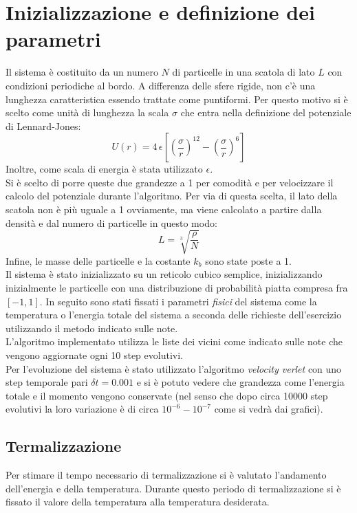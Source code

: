 \section{Inizializzazione e definizione dei parametri}
Il sistema è costituito da un numero $N$ di particelle in una scatola di lato $L$ con condizioni periodiche al bordo. A differenza delle sfere rigide, non c'è una lunghezza caratteristica essendo trattate come puntiformi. Per questo motivo si è scelto come unità di lunghezza la scala $\sigma$ che entra nella definizione del potenziale di Lennard-Jones:
$$
	U(r) = 4 \, \epsilon \left[ \left(\frac{\sigma}{r}\right)^{12} - \left(\frac{\sigma}{r}\right)^6 \right]
$$
Inoltre, come scala di energia è stata utilizzato $\epsilon$.\\
Si è scelto di porre queste due grandezze a 1 per comodità e per velocizzare il calcolo del potenziale durante l'algoritmo. Per via di questa scelta, il lato della scatola non è più uguale a 1 ovviamente, ma viene calcolato a partire dalla densità e dal numero di particelle in questo modo:
$$
	L = \sqrt[3]{\frac{\rho}{N}}
$$
Infine, le masse delle particelle e la costante $k_b$ sono state poste a 1.\\
Il sistema è stato inizializzato su un reticolo cubico semplice, inizializzando inizialmente le particelle con una distribuzione di probabilità piatta compresa fra $[-1,1]$.
In seguito sono stati fissati i parametri \emph{fisici} del sistema come la temperatura o l'energia totale del sistema a seconda delle richieste dell'esercizio utilizzando il metodo indicato sulle note.\\
L'algoritmo implementato utilizza le liste dei vicini come indicato sulle note che vengono aggiornate ogni 10 step evolutivi.\\
Per l'evoluzione del sistema è stato utilizzato l'algoritmo \emph{velocity verlet} con uno step temporale pari $\delta t = 0.001$ e si è potuto vedere che grandezza come l'energia totale e il momento vengono conservate (nel senso che dopo circa 10000 step evolutivi la loro variazione è di circa $10^{-6} - 10^{-7}$ come si vedrà dai grafici).

\subsection{Termalizzazione}
Per stimare il tempo necessario di termalizzazione si è valutato l'andamento dell'energia e della temperatura. Durante questo periodo di termalizzazione si è fissato il valore della temperatura alla temperatura desiderata.

